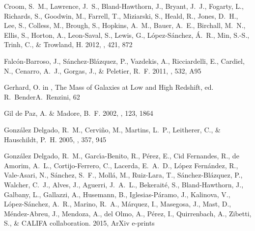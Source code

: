 \begin{thebibliography}
{Croom}, S.~M., {Lawrence}, J.~S., {Bland-Hawthorn}, J., {Bryant}, J.~J.,
  {Fogarty}, L., {Richards}, S., {Goodwin}, M., {Farrell}, T., {Miziarski}, S.,
  {Heald}, R., {Jones}, D.~H., {Lee}, S., {Colless}, M., {Brough}, S.,
  {Hopkins}, A.~M., {Bauer}, A.~E., {Birchall}, M.~N., {Ellis}, S., {Horton},
  A., {Leon-Saval}, S., {Lewis}, G., {L{\'o}pez-S{\'a}nchez}, {\'A}.~R., {Min},
  S.-S., {Trinh}, C., \& {Trowland}, H. 2012, \mnras, 421, 872


{Falc{\'o}n-Barroso}, J., {S{\'a}nchez-Bl{\'a}zquez}, P., {Vazdekis}, A.,
  {Ricciardelli}, E., {Cardiel}, N., {Cenarro}, A.~J., {Gorgas}, J., \&
  {Peletier}, R.~F. 2011, \aap, 532, A95


{Gerhard}, O. in , The Mass of Galaxies at Low and High Redshift, ed.
  R.~{Bender}A.~{Renzini}, 62


{Gil de Paz}, A. \& {Madore}, B.~F. 2002, \aj, 123, 1864


{Gonz{\'a}lez Delgado}, R.~M., {Cervi{\~n}o}, M., {Martins}, L.~P.,
  {Leitherer}, C., \& {Hauschildt}, P.~H. 2005, \mnras, 357, 945


{Gonz{\'a}lez Delgado}, R.~M., {Garc{\'{\i}}a-Benito}, R., {P{\'e}rez}, E.,
  {Cid Fernandes}, R., {de Amorim}, A.~L., {Cortijo-Ferrero}, C., {Lacerda},
  E.~A.~D., {L{\'o}pez Fern{\'a}ndez}, R., {Vale-Asari}, N., {S{\'a}nchez},
  S.~F., {Moll{\'a}}, M., {Ruiz-Lara}, T., {S{\'a}nchez-Bl{\'a}zquez}, P.,
  {Walcher}, C.~J., {Alves}, J., {Aguerri}, J.~A.~L., {Bekerait{\'e}}, S.,
  {Bland-Hawthorn}, J., {Galbany}, L., {Gallazzi}, A., {Husemann}, B.,
  {Iglesias-P{\'a}ramo}, J., {Kalinova}, V., {L{\'o}pez-S{\'a}nchez}, A.~R.,
  {Marino}, R.~A., {M{\'a}rquez}, I., {Masegosa}, J., {Mast}, D.,
  {M{\'e}ndez-Abreu}, J., {Mendoza}, A., {del Olmo}, A., {P{\'e}rez}, I.,
  {Quirrenbach}, A., {Zibetti}, S., \& {CALIFA collaboration}. 2015, ArXiv
  e-prints



\end{thebibliography}
